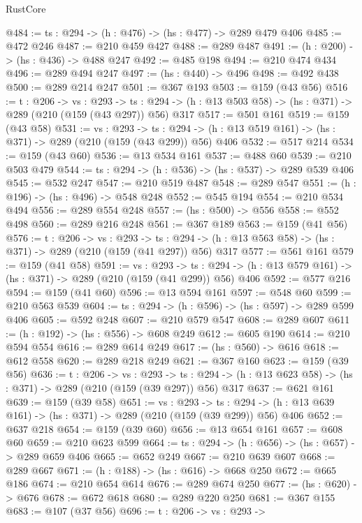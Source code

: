 \begin{lexlean}{RustCore}
\begin{coremodule}
@484 := {ts : @294} -> (h : @476) -> (hs : @477) -> @289 @479 @406
@485 := @472 @246
@487 := @210 @459 @427
@488 := @289 @487
@491 := (h : @200) -> (hs : @436) -> @488 @247
@492 := @485 @198
@494 := @210 @474 @434
@496 := @289 @494 @247
@497 := (hs : @440) -> @496
@498 := @492 @438
@500 := @289 @214 @247
@501 := @367 @193
@503 := @159 (@43 @56)
@516 := {t : @206} ->
  {vs : @293} ->
  {ts : @294} -> (h : @13 @503 @58) -> (hs : @371) -> @289 (@210 (@159 (@43 @297)) @56) @317
@517 := @501 @161
@519 := @159 (@43 @58)
@531 := {vs : @293} ->
  {ts : @294} -> (h : @13 @519 @161) -> (hs : @371) -> @289 (@210 (@159 (@43 @299)) @56) @406
@532 := @517 @214
@534 := @159 (@43 @60)
@536 := @13 @534 @161
@537 := @488 @60
@539 := @210 @503 @479
@544 := {ts : @294} -> (h : @536) -> (hs : @537) -> @289 @539 @406
@545 := @532 @247
@547 := @210 @519 @487
@548 := @289 @547
@551 := (h : @196) -> (hs : @496) -> @548 @248
@552 := @545 @194
@554 := @210 @534 @494
@556 := @289 @554 @248
@557 := (hs : @500) -> @556
@558 := @552 @498
@560 := @289 @216 @248
@561 := @367 @189
@563 := @159 (@41 @56)
@576 := {t : @206} ->
  {vs : @293} ->
  {ts : @294} -> (h : @13 @563 @58) -> (hs : @371) -> @289 (@210 (@159 (@41 @297)) @56) @317
@577 := @561 @161
@579 := @159 (@41 @58)
@591 := {vs : @293} ->
  {ts : @294} -> (h : @13 @579 @161) -> (hs : @371) -> @289 (@210 (@159 (@41 @299)) @56) @406
@592 := @577 @216
@594 := @159 (@41 @60)
@596 := @13 @594 @161
@597 := @548 @60
@599 := @210 @563 @539
@604 := {ts : @294} -> (h : @596) -> (hs : @597) -> @289 @599 @406
@605 := @592 @248
@607 := @210 @579 @547
@608 := @289 @607
@611 := (h : @192) -> (hs : @556) -> @608 @249
@612 := @605 @190
@614 := @210 @594 @554
@616 := @289 @614 @249
@617 := (hs : @560) -> @616
@618 := @612 @558
@620 := @289 @218 @249
@621 := @367 @160
@623 := @159 (@39 @56)
@636 := {t : @206} ->
  {vs : @293} ->
  {ts : @294} -> (h : @13 @623 @58) -> (hs : @371) -> @289 (@210 (@159 (@39 @297)) @56) @317
@637 := @621 @161
@639 := @159 (@39 @58)
@651 := {vs : @293} ->
  {ts : @294} -> (h : @13 @639 @161) -> (hs : @371) -> @289 (@210 (@159 (@39 @299)) @56) @406
@652 := @637 @218
@654 := @159 (@39 @60)
@656 := @13 @654 @161
@657 := @608 @60
@659 := @210 @623 @599
@664 := {ts : @294} -> (h : @656) -> (hs : @657) -> @289 @659 @406
@665 := @652 @249
@667 := @210 @639 @607
@668 := @289 @667
@671 := (h : @188) -> (hs : @616) -> @668 @250
@672 := @665 @186
@674 := @210 @654 @614
@676 := @289 @674 @250
@677 := (hs : @620) -> @676
@678 := @672 @618
@680 := @289 @220 @250
@681 := @367 @155
@683 := @107 (@37 @56)
@696 := {t : @206} ->
  {vs : @293} ->

\end{coremodule}
\end{lexlean}
